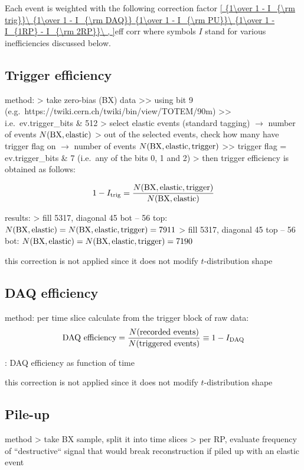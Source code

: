 \vskip3mm
Each event is weighted with the following correction factor
\eqref{
	{1\over 1 - I_{\rm trig}}\ 
	{1\over 1 - I_{\rm DAQ}}
	{1\over 1 - I_{\rm PU}}\ 
	{1\over 1 - I_{1RP} - I_{\rm 2RP}}\ ,
}{eff corr}
where symbols $I$ stand for various inefficiencies discussed below.

\subsection{Trigger efficiency}

\> method:
\>> take zero-bias (BX) data
\>>> using bit 9 (e.g.~https://twiki.cern.ch/twiki/bin/view/TOTEM/90m)
\>>> i.e.~ev.trigger\_bits \& 512
\>> select elastic events (standard tagging) $\rightarrow$ number of events $N({\rm BX,elastic})$
\>> out of the selected events, check how many have trigger flag on $\rightarrow$ number of events $N({\rm BX,elastic,trigger})$
\>>> trigger flag = ev.trigger\_bits \& 7 (i.e.~any of the bits 0, 1 and 2)
\>> then trigger efficiency is obtained as follows:

$$1 - I_{\rm trig} = {N({\rm BX,elastic,trigger}) \over N({\rm BX,elastic})}$$

\> results:
\>> fill 5317, diagonal 45 bot -- 56 top: $N({\rm BX,elastic}) = N({\rm BX,elastic,trigger}) = 7911$
\>> fill 5317, diagonal 45 top -- 56 bot: $N({\rm BX,elastic}) = N({\rm BX,elastic,trigger}) = 7190$

\> this correction is not applied since it does not modify $t$-distribution shape


\subsection{DAQ efficiency}

\> method: per time slice calculate from the trigger block of raw data:
$$\hbox{DAQ efficiency} = {N(\hbox{recorded events})\over N(\hbox{triggered events})} \equiv 1 - I_{\rm DAQ}$$

\> \plot{efficiencies/daq_efficiency.pdf}: DAQ efficiency as function of time

\> this correction is not applied since it does not modify $t$-distribution shape



\subsection{Pile-up}

\> method
\>> take BX sample, split it into time slices
\>> per RP, evaluate frequency of ``destructive`` signal that would break reconstruction if piled up with an elastic event

